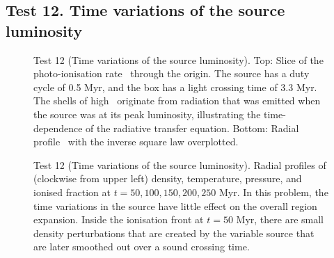 \documentclass[useAMS,usenatbib]{mn2e}
\begin{document}


\subsection{Test 12. Time variations of the source luminosity}

\begin{figure}
  \caption{\label{fig:test12_kph} Test 12 (Time variations of the
    source luminosity).  Top: Slice of the photo-ionisation rate
    \kph~through the origin.  The source has a duty cycle of 0.5 Myr,
    and the box has a light crossing time of 3.3 Myr.  The shells of
    high \kph~originate from radiation that was emitted when the
    source was at its peak luminosity, illustrating the
    time-dependence of the radiative transfer equation.  Bottom:
    Radial profile \kph~with the inverse square law overplotted.}
\end{figure}

\begin{figure}
  \caption{\label{fig:test12_profiles} Test 12 (Time variations of the
    source luminosity).  Radial profiles of (clockwise from upper
    left) density, temperature, pressure, and ionised fraction at $t =
    50, 100, 150, 200, 250$ Myr.  In this problem, the time variations
    in the source have little effect on the overall \hii region
    expansion.  Inside the ionisation front at $t = 50$ Myr, there are
    small density perturbations that are created by the variable
    source that are later smoothed out over a sound crossing time.}
\end{figure}
\end{document}
